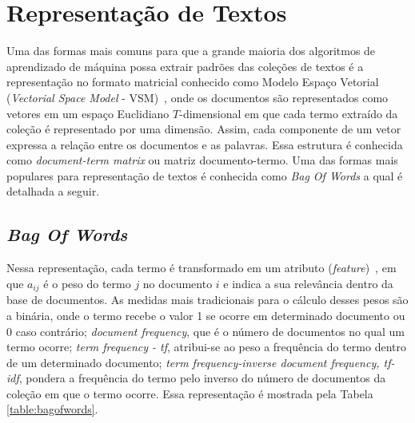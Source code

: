 \section{Representação de Textos} \label{section:RepTextos}


Uma das formas mais comuns para que a grande maioria dos algoritmos de aprendizado de máquina possa extrair padrões das coleções de textos é a representação no formato matricial conhecido como Modelo Espaço Vetorial (\textit{Vectorial Space Model} - VSM)~\cite{Rezende2003}, onde os documentos são representados como vetores em um espaço Euclidiano $T$-dimensional em que cada termo extraído da coleção é representado por uma dimensão. Assim, cada componente de um vetor expressa a relação entre os documentos e as palavras. Essa estrutura é conhecida como \textit{document-term matrix} ou matriz documento-termo. Uma das formas mais populares para representação de textos é conhecida como \textit{Bag Of Words} a qual é detalhada a seguir.
	

\subsection{\textit{Bag Of Words}} \label{subsubsec:BOW}



		
Nessa representação, cada termo é transformado em um atributo  (\textit{feature})~\cite{Rezende2003}, em que $a_{ij}$ é o peso do termo $j$ no documento $i$ e indica a sua relevância dentro da base de documentos. As medidas mais tradicionais para o cálculo desses pesos são a binária, onde o termo recebe o valor 1 se ocorre em determinado documento ou 0 caso contrário; \textit{document frequency}, que é o número de documentos no qual um termo ocorre; \textit{term frequency - tf}, atribui-se ao peso a frequência do termo dentro de um determinado documento; \textit{term frequency-inverse document frequency, tf-idf}, pondera a frequência do termo pelo inverso do número de documentos da coleção em que o termo ocorre.
Essa representação é mostrada pela Tabela \ref{table:bagofwords}.

